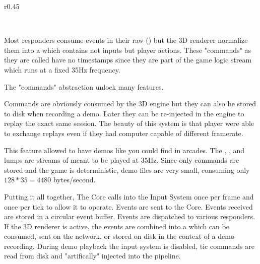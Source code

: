 \begin{wrapfigure}[12]{r}{0.45\textwidth}
\centering
{}
\end{wrapfigure}
\\
\par
Most responders consume events in their raw () but the 3D renderer normalize them into a  which contains not inputs but player actions. These "commands" as they are called have no timestamps since they are part of the game logic stream which runs at a fixed 35Hz frequency. \\
\par
{} \label{cmd_t_type}
\par
The "commands" abstraction unlock many features. \\
\par
Commands are obviously consumed by the 3D engine but they can also be stored to disk when recording a demo. Later they can be re-injected in the engine to replay the exact same session. The beauty of this system is that player were able to exchange replays even if they had computer capable of different framerate.\\
\par
This feature allowed \doom to have demos like you could find in arcades. The , , and  lumps are streams of  meant to be played at 35Hz. Since only commands are stored and the game is deterministic, demo files are very small, consuming only $ 128 * 35 = 4480 $ bytes/second.\\

\par
Putting it all together,  The Core calls into the Input System once per frame and once per tick to allow it to operate.  Events are sent to the Core.  Events received are stored in a circular event buffer.  Events are dispatched to various responders. If the 3D renderer is active, the events are combined into a  which can be consumed, sent on the network, or stored on disk in the context of a demo recording. During demo playback the input system is disabled, tic commands are read from disk and "artifically" injected into the pipeline.
\par